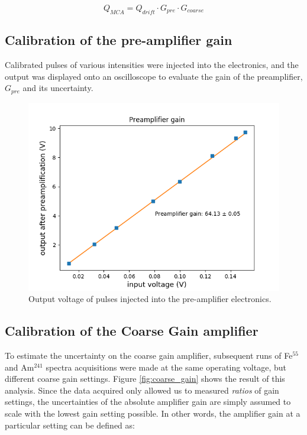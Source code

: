 \begin{equation}
  \label{eq:gain_system}
  Q_{MCA} = Q_{drift}\cdot G_{pre}\cdot G_{coarse}
\end{equation}


\subsection{Calibration of the pre-amplifier gain}
 Calibrated pulses of various intensities were injected into the electronics, and the output was displayed onto an oscilloscope to evaluate the gain of the preamplifier, $G_{pre}$ and its uncertainty.


\begin{figure}[ht]
  \includegraphics[width=\textwidth]{graphics/preamp_gain_calibration.png}
  \caption{Output voltage of pulses injected into the pre-amplifier electronics.}
  \label{fig:preamp_gain}
\end{figure}


\subsection{Calibration of the Coarse Gain amplifier}
To estimate the uncertainty on the coarse gain amplifier, subsequent runs of Fe$^{55}$ and Am$^{241}$ spectra acquisitions were made at the same operating voltage, but different coarse gain settings. Figure \ref{fig:coarse_gain} shows the result of this analysis. Since the data acquired only allowed us to measured \textit{ratios} of gain settings, the uncertainties of the absolute amplifier gain are simply assumed to scale with the lowest gain setting possible. In other words, the amplifier gain at a particular setting can be defined as:

